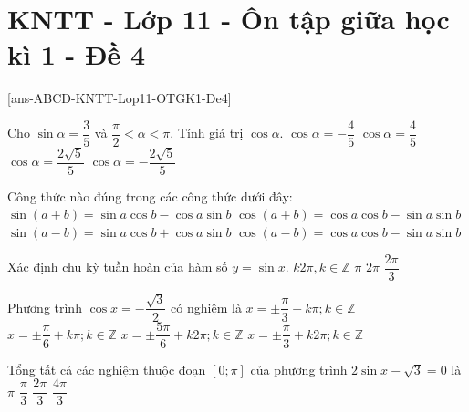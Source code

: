 \section{KNTT - Lớp 11 - Ôn tập giữa học kì 1 - Đề 4}

\caulc
{}[ans-ABCD-KNTT-Lop11-OTGK1-De4]

\begin{ex}%
Cho $\sin \alpha =\dfrac{3}{5}$ và $\dfrac{\pi}{2}<\alpha <\pi$. Tính giá trị $\cos \alpha $.
\choice
{\True $\cos \alpha =-\dfrac{4}{5}$}
{$\cos \alpha =\dfrac{4}{5}$}
{$\cos \alpha =\dfrac{2\sqrt{5}}{5}$}
{$\cos \alpha =-\dfrac{2\sqrt{5}}{5}$}
\end{ex}
\begin{ex}%
Công thức nào đúng trong các công thức dưới đây:
\choice
{$\sin (a+b)=\sin a\cos b-\cos a\sin b$}
{\True $\cos (a+b)=\cos a\cos b-\sin a\sin b$}
{$\sin (a-b)=\sin a\cos b+\cos a\sin b$}
{$\cos (a-b)=\cos a\cos b-\sin a\sin b$}
\end{ex}
\begin{ex}%
Xác định chu kỳ tuần hoàn của hàm số $y=\sin x$.
\choice
{$k2\pi,k\in \mathbb{Z}$}
{$\pi$}
{\True $2\pi$}
{$\dfrac{2\pi}{3}$}
\end{ex}
\begin{ex}%
Phương trình $\cos x=-\dfrac{\sqrt{3}}{2}$ có nghiệm là
\choice
{$x=\pm \dfrac{\pi}{3}+k\pi;k\in \mathbb{Z}$}
{$x=\pm \dfrac{\pi}{6}+k\pi; k\in \mathbb{Z}$}
{\True $x=\pm \dfrac{5\pi}{6}+k2\pi; k\in \mathbb{Z}$}
{$x=\pm \dfrac{\pi}{3}+k2\pi; k\in \mathbb{Z}$}
\end{ex}
\begin{ex}%
Tổng tất cả các nghiệm thuộc đoạn $\left[0;\pi\right]$ của phương trình $2\sin x-\sqrt{3}=0$ là
\choice
{\True $\pi$}
{$\dfrac{\pi}{3}$}
{$\dfrac{2\pi}{3}$}
{$\dfrac{4\pi}{3}$}
\end{ex}
